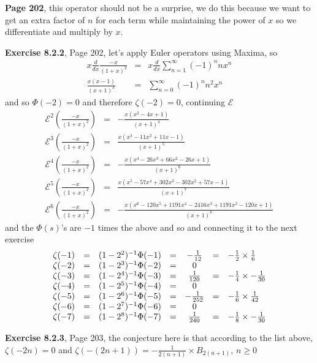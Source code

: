\documentclass[aps,preprint,preprintnumbers,nofootinbib,showpacs,prd]{revtex4-1}
\newcommand{\nbea}{\begin{eqnarray*}}
\newcommand{\neea}{\end{eqnarray*}}
\begin{document}
{\bf Page 202}, this operator should not be a surprise, we do this because we want to get an extra factor of $n$ for each term while maintaining the power of $x$ so we differentiate and multiply by $x$.

{\bf Exercise 8.2.2}, Page 202, let's apply Euler operators using Maxima, so
%
\nbea
x\frac{d}{dx}\frac{-x}{(1+x)^2} & = & x\frac{d}{dx}\sum_{n=1}^\infty (-1)^n n x^n \\
\frac{x(x-1)}{(x+1)^3} & = & \sum_{n=0}^\infty (-1)^{n} {n}^2 x^{n}
\neea
%
and so $\Phi(-2) = 0$ and therefore $\zeta(-2)=0$, continuing $\mathcal{E}$
%
\nbea
\mathcal{E}^2\left(\frac{-x}{(1+x)^2}\right) & = & -\frac{x(x^2-4x+1)}{(x+1)^4} \\
\mathcal{E}^3\left(\frac{-x}{(1+x)^2}\right) & = & \frac{x(x^3-11x^2+11x-1)}{(x+1)^5} \\
\mathcal{E}^4\left(\frac{-x}{(1+x)^2}\right) & = & -\frac{x(x^4-26x^3+66x^2-26x+1)}{(x+1)^6} \\
\mathcal{E}^5\left(\frac{-x}{(1+x)^2}\right) & = & \frac{x(x^5-57x^4+302x^3-302x^2+57x-1)}{(x+1)^7} \\
\mathcal{E}^6\left(\frac{-x}{(1+x)^2}\right) & = & -\frac{x(x^6-120x^5+1191x^4-2416x^3+1191x^2-120x+1)}{(x+1)^8}
\neea
%
and the $\Phi(s)$'s are $-1$ times the above and so and connecting it to the next exercise
%
\nbea
\begin{array}{r c l c c c l}
\zeta(-1) & = & (1-2^2)^{-1}\Phi(-1) & = & -\frac{1}{12} & = & -\frac{1}{2} \times \frac{1}{6}\\
\zeta(-2) & = & (1-2^3)^{-1}\Phi(-2) & = & 0 \\
\zeta(-3) & = & (1-2^4)^{-1}\Phi(-3) & = & \frac{1}{120}  & = & -\frac{1}{4} \times -\frac{1}{30}\\
\zeta(-4) & = & (1-2^5)^{-1}\Phi(-4) & = & 0 \\
\zeta(-5) & = & (1-2^6)^{-1}\Phi(-5) & = & -\frac{1}{252} & = & -\frac{1}{6} \times \frac{1}{42}\\
\zeta(-6) & = & (1-2^7)^{-1}\Phi(-6) & = & 0 \\
\zeta(-7) & = & (1-2^8)^{-1}\Phi(-7) & = & \frac{1}{240} & = & -\frac{1}{8} \times-\frac{1}{30}
\end{array}
\neea
%

{\bf Exercise 8.2.3}, Page 203, the conjecture here is that according to the list above, $\zeta(-2n)=0$ and $\zeta(-(2n+1)) = -\frac{1}{2(n+1)}\times B_{2(n+1)}$, $n\ge0$
\end{document}
